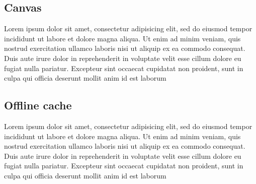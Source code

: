 \subsection{Canvas}

\cite{w3ccanvas}
Lorem ipsum dolor sit amet, consectetur adipisicing elit, sed do eiusmod tempor incididunt ut labore et dolore magna aliqua. Ut enim ad minim veniam, quis nostrud exercitation ullamco laboris nisi ut aliquip ex ea commodo consequat. Duis aute irure dolor in reprehenderit in voluptate velit esse cillum dolore eu fugiat nulla pariatur.  Excepteur sint occaecat cupidatat non proident, sunt in culpa qui officia deserunt mollit anim id est laborum

\subsection{Offline cache}

\cite{html5boilerplate}
\cite{appcache01}
Lorem ipsum dolor sit amet, consectetur adipisicing elit, sed do eiusmod tempor incididunt ut labore et dolore magna aliqua. Ut enim ad minim veniam, quis nostrud exercitation ullamco laboris nisi ut aliquip ex ea commodo consequat. Duis aute irure dolor in reprehenderit in voluptate velit esse cillum dolore eu fugiat nulla pariatur.  Excepteur sint occaecat cupidatat non proident, sunt in culpa qui officia deserunt mollit anim id est laborum

